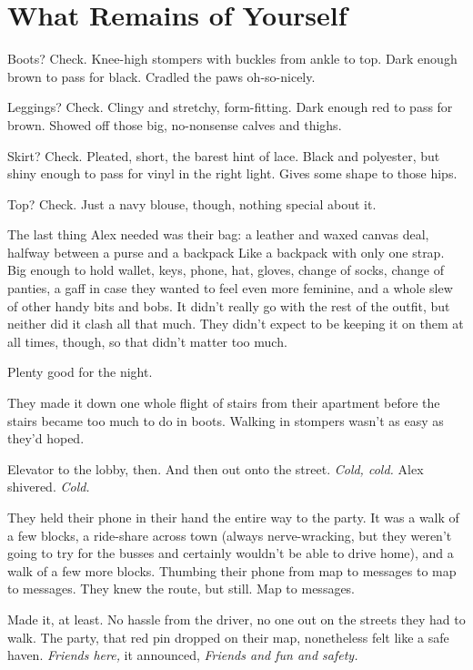 \hypertarget{what-remains-of-yourself}{%
\chapter{What Remains of Yourself}\label{what-remains-of-yourself}}

\vspace{0.5cm}

Boots? Check. Knee-high stompers with buckles from ankle to top. Dark enough brown to pass for black. Cradled the paws oh-so-nicely.

Leggings? Check. Clingy and stretchy, form-fitting. Dark enough red to pass for brown. Showed off those big, no-nonsense calves and thighs.

Skirt? Check. Pleated, short, the barest hint of lace. Black and polyester, but shiny enough to pass for vinyl in the right light. Gives some shape to those hips.

Top? Check. Just a navy blouse, though, nothing special about it.

The last thing Alex needed was their bag: a leather and waxed canvas deal, halfway between a purse and a backpack Like a backpack with only one strap. Big enough to hold wallet, keys, phone, hat, gloves, change of socks, change of panties, a gaff in case they wanted to feel even more feminine, and a whole slew of other handy bits and bobs. It didn't really go with the rest of the outfit, but neither did it clash all that much. They didn't expect to be keeping it on them at all times, though, so that didn't matter too much.

Plenty good for the night.\newpage

They made it down one whole flight of stairs from their apartment before the stairs became too much to do in boots. Walking in stompers wasn't as easy as they'd hoped.

Elevator to the lobby, then. And then out onto the street. \emph{Cold, cold.} Alex shivered. \emph{Cold.}

They held their phone in their hand the entire way to the party. It was a walk of a few blocks, a ride-share across town (always nerve-wracking, but they weren't going to try for the busses and certainly wouldn't be able to drive home), and a walk of a few more blocks. Thumbing their phone from map to messages to map to messages. They knew the route, but still. Map to messages.

Made it, at least. No hassle from the driver, no one out on the streets they had to walk. The party, that red pin dropped on their map, nonetheless felt like a safe haven. \emph{Friends here,} it announced, \emph{Friends and fun and safety.}

